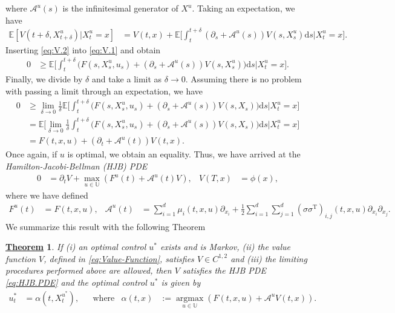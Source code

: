 \documentclass[12pt]{book}
\let\varphi\phi
\numberwithin{equation}{chapter}
\theoremstyle{plain}
\newtheorem{theorem}{\underline{Theorem}}
\numberwithin{theorem}{section}
\theoremstyle{definition}
\numberwithin{exercise}{chapter}
\newcommand{\<}{\langle}
\renewcommand{\>}{\rangle}
\renewcommand{\(}{\left(}
\renewcommand{\)}{\right)}
\renewcommand{\[}{\left[}
\renewcommand{\]}{\right]}
\newcommand\Eb{\mathds{E}}
\newcommand\Ub{\mathds{U}}
\newcommand\Ac{\mathscr{A}}
\newcommand\sig{\sigma}
\newcommand\del{\delta}
\renewcommand\d{\partial}
\newcommand\dd{\mathrm{d}}
\begin{document}
where $\Ac^u(s)$ is the infinitesimal generator of $X^u$.  
Taking an expectation, we have
\begin{align}
\Eb[ V(t+\del,X_{t+\del}^u) | X_t^u = x ]
	&=	V(t,x) + \Eb \Big[  \int_t^{t+\del} ( \d_s + \Ac^u(s) )V(s,X_s^u) \dd s \Big| X_t^u = x \Big] . \label{eq:V.2}
\end{align}
Inserting \eqref{eq:V.2} into \eqref{eq:V.1} and obtain
\begin{align}
0
	&\geq \Eb \Big[ 
			\int_t^{t + \del} \Big( F(s,X_s^u,u_s) + ( \d_s + \Ac^u(s) ) V(s,X_s^u)  \Big) \dd s
			\Big| X_t^u = x \Big] .
\end{align}
Finally, we divide by $\del$ and take a limit as $\del \to 0$.  Assuming there is no problem with passing a limit through an expectation, we have
\begin{align}
0
	&\geq \lim_{\del \to 0} \frac{1}{\del} \Eb \Big[ 
			\int_t^{t + \del} \Big( F(s,X_s^u,u_s) + ( \d_s + \Ac^u(s) ) V(s,X_s)  \Big) \dd s
			\Big| X_t^u = x \Big] \\
	&=	\Eb \Big[ \lim_{\del \to 0} \frac{1}{\del} 
			\int_t^{t + \del} \Big( F(s,X_s^u,u_s) + ( \d_s + \Ac^u(s) ) V(s,X_s)  \Big) \dd s
			\Big| X_t^u = x \Big] \\
	&=	F(t,x,u) + (\d_t + \Ac^u(t)) V(t,x) .
\end{align}
Once again, if $u$ is optimal, we obtain an equality.  Thus, we have arrived at the \emph{Hamilton-Jacobi-Bellman (HJB) PDE}
\begin{align}
0
	&=	\d_t V + \max_{u \in \Ub} \( F^u(t) + \Ac^u(t) V \) , &
V(T,x)
	&=	\varphi(x) , \label{eq:HJB.PDE}
\end{align}
where we have defined
\begin{align}
F^u(t)
	&=	F(t,x,u) , &
\Ac^u(t)
	&=	\sum_{i=1}^d \mu_i(t,x,u) \d_{x_i} + \tfrac{1}{2} \sum_{i=1}^d \sum_{j=1}^d \( \sig \sig^\text{T} \)_{i,j}(t,x,u) \d_{x_i} \d_{x_j} .
\end{align}
We summarize this result with the following Theorem

\begin{theorem}
\label{thm:hjb.I}
If (i) an optimal control $u^*$ exists and is Markov, (ii) the value function $V$, defined in \eqref{eq:Value-Function}, satisfies $V \in C^{1,2}$ and (iii) the limiting procedures performed above are allowed, then $V$ satisfies the HJB PDE \eqref{eq:HJB.PDE} and the optimal control $u^*$ is given by
\begin{align}
u_t^*
	&=	\alpha(t,X_t^{u^*}) , &
	&\text{where}&
\alpha(t,x)
	&:=	\operatorname*{argmax}_{u \in \Ub} \( F(t,x,u) + \Ac^u V(t,x) \) . \label{eq:u.star}
\end{align}
\end{theorem}
\end{document}
